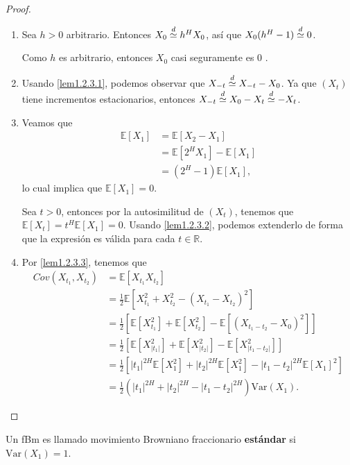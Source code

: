 \documentclass[letterpaper,12pt,oneside]{book}
\theoremstyle{plain}
\numberwithin{theorem}{section}
\begin{document}
\begin{proof}
	\begin{enumerate}
		\item Sea $h>0$ arbitrario. Entonces $X_0\buildrel d \over\simeq h^{H}X_0$, así que $X_0(h^{H}-1)\buildrel d \over\simeq0$.
		
		Como $h$ es arbitrario, entonces $X_0$ casi seguramente es $0$ .
		\item Usando \ref{lem1.2.3.1}, podemos observar que $X_{-t}\buildrel d \over\simeq X_{-t}-X_0$.
		Ya que $(X_t)$ tiene incrementos estacionarios, entonces $X_{-t}\buildrel d \over\simeq X_0-X_t\buildrel d \over\simeq -X_t$.
		\item Veamos que
			\begin{align*}
				\mathbb E[X_1]&=\mathbb E[X_2-X_1]\\
							&=\mathbb E[2^{H}X_1]-\mathbb E[X_1]\\
							&=(2^{H}-1)\mathbb E[X_1],
			\end{align*}
			lo cual implica que $\mathbb E[X_1]=0$.
			
			Sea $t>0$, entonces por la autosimilitud de $(X_t)$, tenemos que $\mathbb E[X_t]=t^{H}\mathbb E[X_1]=0$. Usando \ref{lem1.2.3.2}, podemos extenderlo de forma que la expresión es válida para cada $t\in \mathbb R$.
		\item Por \ref{lem1.2.3.3}, tenemos que
			\begin{align*}
				Cov(X_{t_1},X_{t_2})&=\mathbb E\left[X_{t_1}X_{t_2}\right]\\
								&=\frac{1}{2}\mathbb E\left[X^2_{t_1}+X^2_{t_2}-(X_{t_1}-X_{t_2})^2\right]\\
								&=\frac{1}{2}\left[\mathbb E\left[X^2_{t_1}\right]+\mathbb E\left[X^2_{t_2}\right]-\mathbb E\left[(X_{t_1-t_2}-X_{0})^2\right]\right]\\
								&=\frac{1}{2}\left[\mathbb E\left[X^2_{|t_1|}\right]+\mathbb E\left[X^2_{|t_2|}\right]-\mathbb E\left[X_{|t_1-t_2|}^2\right]\right]\\
								&=\frac{1}{2}\left[|t_1|^{2H}\mathbb E\left[X^2_{1}\right]+|t_2|^{2H}\mathbb E\left[X^2_{1}\right]-|t_1-t_2|^{2H}\mathbb E\left[X_{1}\right]^2\right]\\
								&=\frac{1}{2}(|t_1|^{2H}+|t_2|^{2H}-|t_1-t_2|^{2H})\mathrm{Var}(X_1).
			\end{align*}
	\end{enumerate}
\end{proof}
Un fBm es llamado movimiento Browniano fraccionario \textbf{estándar} si $\mathrm{Var}(X_1)=1$.
\end{document}
